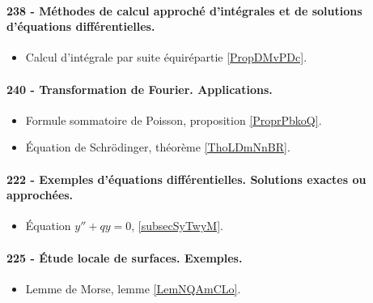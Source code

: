 \paragraph{238 - Méthodes de calcul approché d'intégrales et de solutions d’équations différentielles.}
\begin{itemize}
    \item Calcul d'intégrale par suite équirépartie \ref{PropDMvPDc}.
\end{itemize}
\paragraph{240 - Transformation de Fourier. Applications.}
\begin{itemize}
    \item Formule sommatoire de Poisson, proposition \ref{ProprPbkoQ}.
    \item Équation de Schrödinger, théorème \ref{ThoLDmNnBR}.
\end{itemize}
\paragraph{222 - Exemples d’équations différentielles. Solutions exactes ou approchées.}
\begin{itemize}
    \item Équation \( y''+qy=0\), \ref{subsecSyTwyM}.
\end{itemize}
\paragraph{225 - Étude locale de surfaces. Exemples.}
\begin{itemize}
    \item Lemme de Morse, lemme \ref{LemNQAmCLo}.
\end{itemize}
